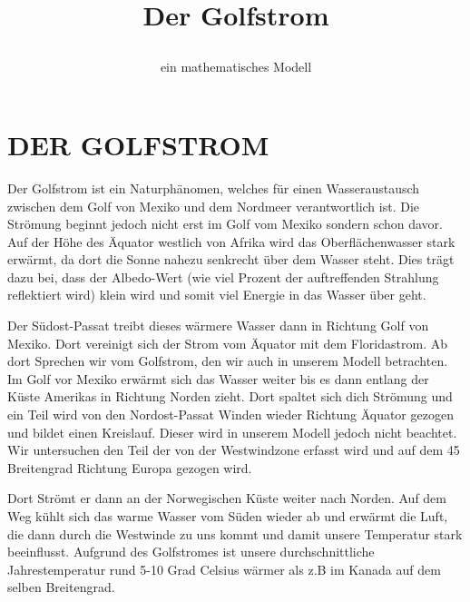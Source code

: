 \documentclass[a4paper,twoside]{article}
\begin{document}
	\title{Der Golfstrom\subtitle{ein mathematisches Modell} }
	
	\author{}
	

	
	\onecolumn \maketitle \normalsize \vfill

	\section{\uppercase{Der Golfstrom}}\label{sec:Golfstrom}

	\noindent Der Golfstrom ist ein Naturphänomen, welches für einen Wasseraustausch zwischen dem Golf von Mexiko und dem Nordmeer verantwortlich ist. Die Strömung beginnt jedoch nicht erst im Golf vom Mexiko sondern schon davor. Auf der Höhe des Äquator westlich von Afrika wird das Oberflächenwasser stark erwärmt, da dort die Sonne nahezu senkrecht über dem Wasser steht. Dies trägt dazu bei, dass der Albedo-Wert (wie viel Prozent der auftreffenden Strahlung reflektiert wird) klein wird und somit viel Energie in das Wasser über geht.

	Der Südost-Passat treibt dieses wärmere Wasser dann in Richtung Golf von Mexiko. Dort vereinigt sich der Strom vom Äquator mit dem Floridastrom. Ab dort Sprechen wir vom Golfstrom, den wir auch in unserem Modell betrachten. Im Golf vor Mexiko erwärmt sich das Wasser weiter bis es dann entlang der Küste Amerikas in Richtung Norden zieht. Dort spaltet sich dich Strömung und ein Teil wird von den Nordost-Passat Winden wieder Richtung Äquator gezogen und bildet einen Kreislauf. Dieser wird in unserem Modell jedoch nicht beachtet. Wir untersuchen den Teil der von der Westwindzone erfasst wird und auf dem 45 Breitengrad Richtung Europa gezogen wird.

	Dort Strömt er dann an der Norwegischen Küste weiter nach Norden. Auf dem Weg kühlt sich das warme Wasser vom Süden wieder ab und erwärmt die Luft, die dann durch die Westwinde zu uns kommt und damit unsere Temperatur stark beeinflusst. Aufgrund des Golfstromes ist unsere durchschnittliche Jahrestemperatur rund 5-10 Grad Celsius wärmer als z.B im Kanada auf dem selben Breitengrad. 
\end{document}

